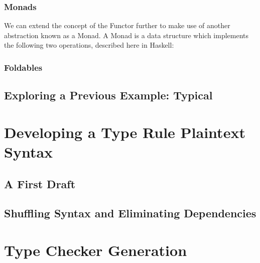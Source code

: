 \documentclass{UoYCSproject}
\begin{document}
\subsection{Monads}
We can extend the concept of the Functor further to make use of another
abstraction known as a Monad. A Monad is a data structure which implements the 
following two operations, described here in Haskell:


\subsection{Foldables}

\cite{MilewskiCTFP}

\section{Exploring a Previous Example: Typical}

\chapter{Developing a Type Rule Plaintext Syntax}

\cite{Typical}

\section{A First Draft}

\section{Shuffling Syntax and Eliminating Dependencies}

\chapter{Type Checker Generation}



\printbibliography
\end{document}
